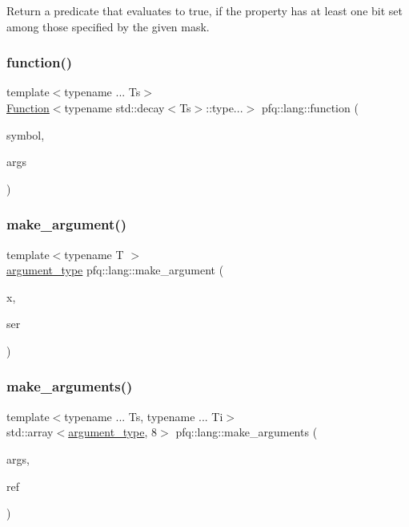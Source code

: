 Return a predicate that evaluates to {\ttfamily true}, if the property has at least one bit set among those specified by the given mask. 

\mbox{\label{namespacepfq_1_1lang_a1a4638059d700ae08d0ca63886ff2bb3}} 
\subsubsection{\texorpdfstring{function()}{function()}}
{\footnotesize\ttfamily template$<$typename ... Ts$>$ \\
\hyperlink{structpfq_1_1lang_1_1Function}{Function}$<$typename std\+::decay$<$Ts$>$\+::type...$>$ pfq\+::lang\+::function (\begin{DoxyParamCaption}\item[{std\+::string}]{symbol,  }\item[{Ts \&\&...}]{args }\end{DoxyParamCaption})}

\mbox{\label{namespacepfq_1_1lang_ac28f404ec59b7aea311721e0f26b5577}} 
\subsubsection{\texorpdfstring{make\+\_\+argument()}{make\_argument()}}
{\footnotesize\ttfamily template$<$typename T $>$ \\
\hyperlink{structpfq_1_1lang_1_1argument__type}{argument\+\_\+type} pfq\+::lang\+::make\+\_\+argument (\begin{DoxyParamCaption}\item[{T const \&}]{x,  }\item[{std\+::vector$<$ \hyperlink{structpfq_1_1lang_1_1FunctionDescr}{Function\+Descr} $>$ const \&}]{ser }\end{DoxyParamCaption})}

\mbox{\label{namespacepfq_1_1lang_aacc9139aafd72e1f19af3a74c1fdc6dc}} 
\subsubsection{\texorpdfstring{make\+\_\+arguments()}{make\_arguments()}}
{\footnotesize\ttfamily template$<$typename ... Ts, typename ... Ti$>$ \\
std\+::array$<$\hyperlink{structpfq_1_1lang_1_1argument__type}{argument\+\_\+type}, 8$>$ pfq\+::lang\+::make\+\_\+arguments (\begin{DoxyParamCaption}\item[{std\+::tuple$<$ Ts... $>$ const \&}]{args,  }\item[{std\+::tuple$<$ Ti... $>$ const \&}]{ref }\end{DoxyParamCaption})}

